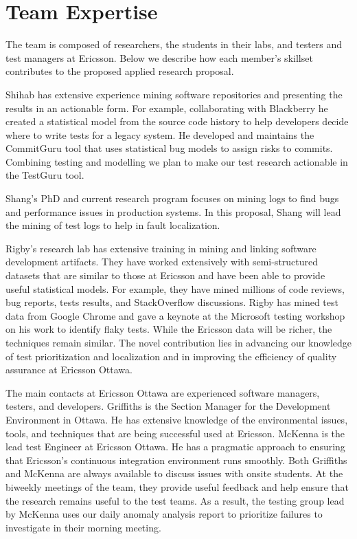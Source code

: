 \section*{Team Expertise}

The team is composed of researchers, the students in their labs, and testers and test managers at Ericsson. Below we describe how each member's skillset contributes to the proposed applied research proposal.

Shihab has extensive experience mining software repositories and presenting the results in an actionable form.
For example, collaborating with Blackberry he created a statistical model from the source code history to help developers decide where to write tests for a legacy system. He developed and maintains the CommitGuru tool that uses statistical bug models to assign risks to commits. Combining testing and modelling we plan to make our test research actionable in the TestGuru tool.

Shang's PhD and current research program focuses on mining logs to find bugs and performance issues in production systems.
In this proposal, Shang will lead the mining of test logs to help in fault localization.

Rigby's research lab has extensive training in mining and linking software
development artifacts. They have worked extensively with semi-structured
datasets that are similar to those at Ericsson and have been able to provide
useful statistical models. For example, they have mined millions of code
reviews, bug reports, tests results, and  StackOverflow discussions. Rigby has
mined test data from Google Chrome and gave a keynote at the
Microsoft testing workshop on his work to identify flaky tests.  While the
Ericsson data will be richer, the techniques remain similar.  The novel
contribution lies in advancing our knowledge of test prioritization and
localization and in improving the efficiency of quality assurance at Ericsson
Ottawa.


The main contacts at Ericsson Ottawa are experienced software managers, testers, and developers. Griffiths is the Section Manager for the Development
Environment in Ottawa. He has extensive knowledge of the environmental issues, tools, and techniques that are being successful used at Ericsson. McKenna is the lead
test Engineer at Ericsson Ottawa. He has a pragmatic approach to ensuring that Ericsson's continuous integration environment runs smoothly. Both Griffiths and McKenna are always available to discuss issues with onsite students. At the biweekly meetings of the team, they provide useful feedback and help ensure that the research remains useful to the test teams. As a result, the testing group lead by McKenna uses our daily anomaly analysis report to prioritize failures to investigate in their morning meeting.
